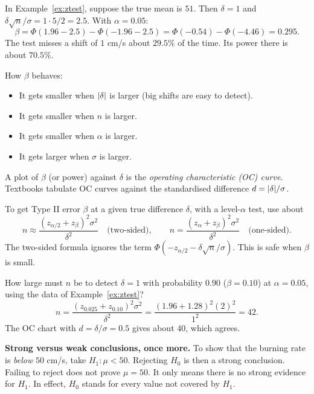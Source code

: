 \begin{example}\label{ex:beta}
In Example~\ref{ex:ztest}, suppose the true mean is $51$. Then $\delta=1$ and $\delta\sqrt n/\sigma=1\cdot5/2=2.5$. With $\alpha=0.05$:
\[ \beta=\Phi(1.96-2.5)-\Phi(-1.96-2.5)=\Phi(-0.54)-\Phi(-4.46)=0.295. \]
The test misses a shift of $1$ cm/s about $29.5\%$ of the time. Its power there is about $70.5\%$.
\end{example}

How $\beta$ behaves:
\begin{itemize}
  \item It gets smaller when $\lvert\delta\rvert$ is larger (big shifts are easy to detect).
  \item It gets smaller when $n$ is larger.
  \item It gets smaller when $\alpha$ is larger.
  \item It gets larger when $\sigma$ is larger.
\end{itemize}
A plot of $\beta$ (or power) against $\delta$ is the \emph{operating characteristic (OC) curve}. Textbooks tabulate OC curves against the standardised difference $d=\lvert\delta\rvert/\sigma$.

\begin{theorem}\label{thm:samplesize-test}
To get Type II error $\beta$ at a given true difference $\delta$, with a level-$\alpha$ test, use about
\[ n\approx\frac{(z_{\alpha/2}+z_\beta)^2\sigma^2}{\delta^2}\quad\text{(two-sided)},\qquad n=\frac{(z_\alpha+z_\beta)^2\sigma^2}{\delta^2}\quad\text{(one-sided)}. \]
The two-sided formula ignores the term $\Phi(-z_{\alpha/2}-\delta\sqrt n/\sigma)$. This is safe when $\beta$ is small.
\end{theorem}

\begin{example}
How large must $n$ be to detect $\delta=1$ with probability $0.90$ ($\beta=0.10$) at $\alpha=0.05$, using the data of Example~\ref{ex:ztest}?
\[ n=\frac{(z_{0.025}+z_{0.10})^2\sigma^2}{\delta^2}=\frac{(1.96+1.28)^2(2)^2}{1^2}=42. \]
The OC chart with $d=\delta/\sigma=0.5$ gives about $40$, which agrees.
\end{example}

\textbf{Strong versus weak conclusions, once more.} To show that the burning rate is \emph{below} $50$ cm/s, take $H_1:\mu<50$. Rejecting $H_0$ is then a strong conclusion. Failing to reject does not prove $\mu=50$. It only means there is no strong evidence for $H_1$. In effect, $H_0$ stands for every value not covered by $H_1$.

